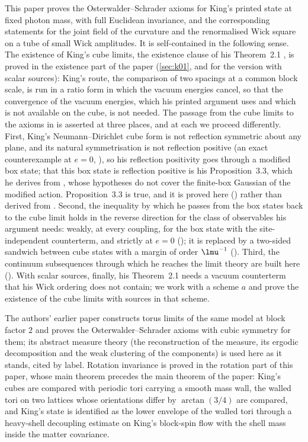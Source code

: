 This paper proves the Osterwalder--Schrader axioms for King's printed state at fixed photon mass, with
full Euclidean invariance, and the corresponding statements for the joint field of the curvature and the
renormalised Wick square on a tube of small Wick amplitudes. It is self-contained in the following sense.
The existence of King's cube limits, the existence clause of his Theorem~2.1 \cite{K2}, is proved in the
existence part of the paper (\cref{sec:k01}, and  for the
version with scalar sources): King's route, the comparison of two spacings at a common block scale, is run
in a ratio form in which the vacuum energies cancel, so that the convergence of the vacuum energies, which
his printed argument uses and which is not available on the cube, is not needed. The passage from the cube
limits to the axioms in \cite{K2} is asserted at three places, and at each we proceed differently. First,
King's Neumann--Dirichlet cube form is not reflection symmetric about any plane, and its natural
symmetrisation is not reflection positive (an exact counterexample at $e=0$, ), so his
reflection positivity goes through a modified box state; that this box state is reflection positive is his
Proposition~3.3, which he derives from \cite[Cor.~5.4]{BFS1}, whose hypotheses do not cover the finite-box
Gaussian of the modified action. Proposition~3.3 is true, and it is proved here ()
rather than derived from \cite[Cor.~5.4]{BFS1}. Second, the inequality by which he passes from the box
states back to the cube limit holds in the reverse direction for the class of observables his argument
needs: weakly, at every coupling, for the box state with the site-independent counterterm, and strictly at
$e=0$ (); it is replaced by a two-sided sandwich between cube states with a margin of order
$\lmu^{-1}$ (). Third, the continuum subsequences through which he reaches the
limit theory are built here (). With scalar sources, finally, his Theorem~2.1 needs a
vacuum counterterm that his Wick ordering does not contain; we work with a scheme $a$ and prove the
existence of the cube limits with sources in that scheme.

The authors' earlier paper \cite{SymPhase} constructs torus limits of the same model at block factor $2$
and proves the Osterwalder--Schrader axioms with cubic symmetry for them; its abstract measure theory (the
reconstruction of the measure, its ergodic decomposition and the weak clustering of the components) is used
here as it stands, cited by label. Rotation invariance is proved in the rotation part of this paper, whose
main theorem precedes the main theorem of the paper: King's cubes are compared with periodic tori carrying
a smooth mass wall, the walled tori on two lattices whose orientations differ by $\arctan(3/4)$ are
compared, and King's state is identified as the lower envelope of the walled tori through a heavy-shell
decoupling estimate on King's block-spin flow with the shell mass inside the matter covariance.

